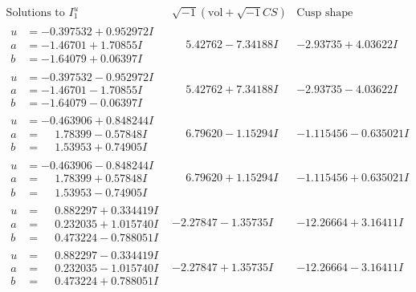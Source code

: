 \documentclass[1p]{elsarticle_modified}
\theoremstyle{definition}
\newcommand{\I}{\sqrt{-1}}
\begin{document}
$$\begin{array}{c|c|c}  
\text{Solutions to }I^u_{1}& \I (\text{vol} + \sqrt{-1}CS) & \text{Cusp shape}\\
 \hline 
\begin{aligned}
u &= -0.397532 + 0.952972 I \\
a &= -1.46701 + 1.70855 I \\
b &= -1.64079 + 0.06397 I\end{aligned}
 & \phantom{-}5.42762 - 7.34188 I & -2.93735 + 4.03622 I \\ \hline\begin{aligned}
u &= -0.397532 - 0.952972 I \\
a &= -1.46701 - 1.70855 I \\
b &= -1.64079 - 0.06397 I\end{aligned}
 & \phantom{-}5.42762 + 7.34188 I & -2.93735 - 4.03622 I \\ \hline\begin{aligned}
u &= -0.463906 + 0.848244 I \\
a &= \phantom{-}1.78399 - 0.57848 I \\
b &= \phantom{-}1.53953 + 0.74905 I\end{aligned}
 & \phantom{-}6.79620 - 1.15294 I & -1.115456 - 0.635021 I \\ \hline\begin{aligned}
u &= -0.463906 - 0.848244 I \\
a &= \phantom{-}1.78399 + 0.57848 I \\
b &= \phantom{-}1.53953 - 0.74905 I\end{aligned}
 & \phantom{-}6.79620 + 1.15294 I & -1.115456 + 0.635021 I \\ \hline\begin{aligned}
u &= \phantom{-}0.882297 + 0.334419 I \\
a &= \phantom{-}0.232035 + 1.015740 I \\
b &= \phantom{-}0.473224 - 0.788051 I\end{aligned}
 & -2.27847 - 1.35735 I & -12.26664 + 3.16411 I \\ \hline\begin{aligned}
u &= \phantom{-}0.882297 - 0.334419 I \\
a &= \phantom{-}0.232035 - 1.015740 I \\
b &= \phantom{-}0.473224 + 0.788051 I\end{aligned}
 & -2.27847 + 1.35735 I & -12.26664 - 3.16411 I \\ \hline\begin{aligned}

\end{aligned}
\end{array}$$
\end{document}

